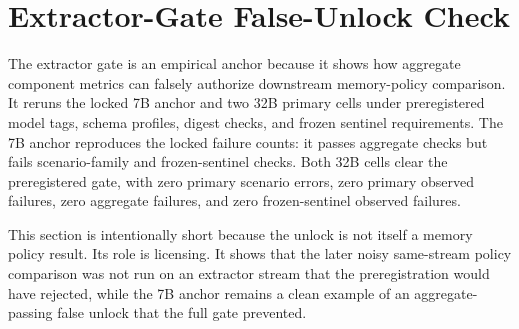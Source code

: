 \section{Extractor-Gate False-Unlock Check}

The extractor gate is an empirical anchor because it shows how aggregate
component metrics can falsely authorize downstream memory-policy comparison.
It reruns the locked 7B anchor and two 32B primary cells under preregistered
model tags, schema profiles, digest checks, and frozen sentinel requirements.
The 7B anchor reproduces the locked failure counts: it passes aggregate checks
but fails scenario-family and frozen-sentinel checks. Both 32B cells clear the
preregistered gate, with zero primary scenario errors, zero primary observed
failures, zero aggregate failures, and zero frozen-sentinel observed failures.

This section is intentionally short because the unlock is not itself a memory
policy result. Its role is licensing. It shows that the later noisy
same-stream policy comparison was not run on an extractor stream that the
preregistration would have rejected, while the 7B anchor remains a clean
example of an aggregate-passing false unlock that the full gate prevented.
